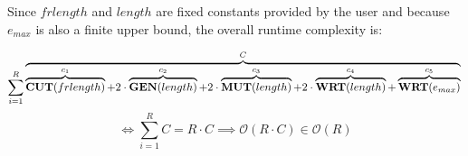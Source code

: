 \documentclass[12pt]{article}
\begin{document}
\begin{enumerate}
		Since $frlength$ and $length$ are fixed constants provided by the user and because $e_{max}$ is
		also a finite upper bound, the overall runtime complexity is:

		\begin{equation*}
			\sum_{i=1}^{R}   \overbrace{\overbrace{\mathbf{CUT}(frlength)}^{c_{1}}  + 2 \cdot \overbrace{\mathbf{GEN}(length)}^{c_{2}}  + 2 \cdot \overbrace{\mathbf{MUT}(length)}^{c_{3}}  + 2 \cdot \overbrace{\mathbf{WRT}(length)}^{c_{4}}  + \overbrace{\mathbf{WRT}(e_{max})}^{c_{5}}}^{C}\\
		\end{equation*}
		\begin{equation*}
			\iff \sum_{i=1}^{R} C = R \cdot C \implies \mathcal{O}(R \cdot C) \in \mathcal{O}(R)
		\end{equation*}


\end{enumerate}
\end{document}
